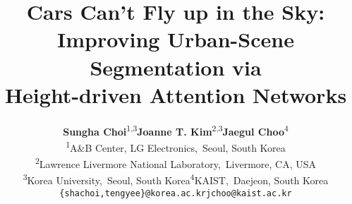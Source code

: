 \documentclass[10pt,twocolumn,letterpaper]{article}
\newcommand*{\affaddr}[1]{#1} \newcommand*{\affmark}[1][*]{\textsuperscript{#1}}
\newcommand*{\email}[1]{\texttt{#1}}
\begin{document}
\title{Cars Can't Fly up in the Sky: Improving Urban-Scene Segmentation via\\Height-driven Attention Networks}

\author{
\textbf{Sungha Choi}\affmark[1,3]\quad\quad\textbf{Joanne T. Kim}\affmark[2,3]\quad\quad \textbf{Jaegul Choo}\affmark[4]
\vspace*{0.1cm}
\\
\affaddr{\affmark[1]A\&B Center, LG Electronics,\, Seoul, South Korea\\
\affmark[2]Lawrence Livermore National Laboratory,\, Livermore, CA, USA\\
\affmark[3]Korea University,\, Seoul, South Korea\quad\quad\affmark[4]KAIST,\, Daejeon, South Korea}\\
\small{\email{\{shachoi,tengyee\}@korea.ac.kr}\quad\email{jchoo@kaist.ac.kr}}\\
}

\maketitle
\thispagestyle{empty}
\end{document}
